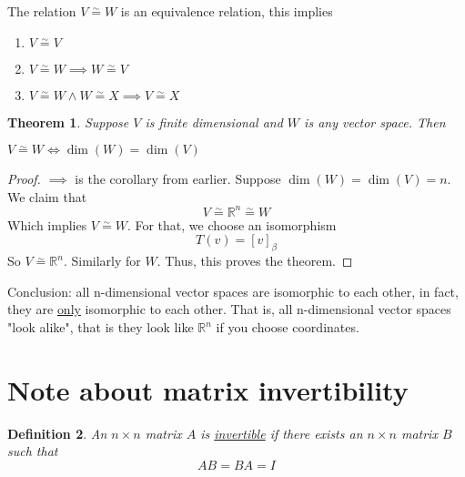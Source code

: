 \documentclass{article}
\newtheorem{theorem}{Theorem}[section]
\newtheorem{definition}[theorem]{Definition}
\newtheorem{one minute paper}[theorem]{One Minute Paper}
\begin{document}
The relation $V \overset{\sim}{=} W$ is an equivalence relation, this implies
\begin{enumerate}
    \item $V \overset{\sim}{=} V$
    \item $V \overset{\sim}{=} W \implies W \overset{\sim}{=} V$
    \item $V \overset{\sim}{=} W \land W \overset{\sim}{=} X \implies V \overset{\sim}{=} X$
\end{enumerate}

\begin{theorem}
    Suppose $V$ is finite dimensional and $W$ is any vector space. Then 
    \begin{center}
        $V \overset{\sim}{=} W \iff \dim(W) = \dim(V)$ 
    \end{center}
\end{theorem}

\begin{proof}
    $\implies$ is the corollary from earlier. Suppose $\dim(W) = \dim(V) = n$. We claim that 
    \begin{equation}
        V \overset{\sim}{=} \mathbb{R}^n \overset{\sim}{=} W
    \end{equation}
    Which implies $V \overset{\sim}{=} W$. For that, we choose an isomorphism 
    \begin{equation}
        T(v) = [v]_\beta
    \end{equation}
    So $V \overset{\sim}{=} \mathbb{R}^n$. Similarly for $W$. Thus, this proves the theorem. 
\end{proof}

Conclusion: all n-dimensional vector spaces are isomorphic to each other, in fact, they are \underline{only} isomorphic to each other. That is, all n-dimensional vector spaces "look alike", that is 
they look like $\mathbb{R}^n$ if you choose coordinates. 

\section*{Note about matrix invertibility}

\begin{definition}
    An $n \times n$ matrix $A$ is \underline{invertible} if there exists an $n \times n$ matrix $B$ such that 
    \begin{equation}
        AB = BA = I
    \end{equation}
\end{definition}
\end{document}
